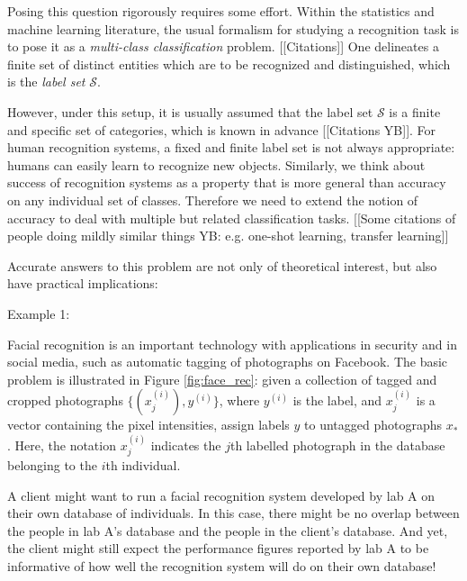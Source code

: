 \documentclass[twoside,11pt]{article}
\begin{document}
Posing this question rigorously requires some effort. 
Within the statistics and machine learning literature, the usual
formalism for studying a recognition task is to pose it as a
\emph{multi-class classification} problem. [[Citations]] One delineates a finite
set of distinct entities which are to be recognized and distinguished,
which is the \emph{label set} $\mathcal{S}$. 

However, under this setup, it is usually assumed that the
label set $\mathcal{S}$ is a finite and specific set of categories, which is known in advance [[Citations YB]]. For human recognition systems, a fixed and finite label set is not always appropriate: humans can easily learn to recognize new objects. Similarly, we think about success of recognition systems as a property that is more general than accuracy on any individual set of classes. Therefore we need to extend the notion of accuracy to deal with multiple but related classification tasks.
[[Some citations of people doing mildly similar things YB: e.g. one-shot learning, transfer learning]] 


Accurate answers to this problem are not only of theoretical interest, but also have practical implications:

Example 1:

Facial recognition is an important technology with applications in
security and in social media, such as automatic tagging of photographs
on Facebook.  The basic problem is illustrated in Figure
\ref{fig:face_rec}: given a collection of tagged and cropped
photographs $\{(x_j^{(i)}), y^{(i)}\}$, where $y^{(i)}$ is the
label, and $x_j^{(i)}$ is a vector containing the pixel intensities, assign labels $y$ to
untagged photographs $x_*$.  Here, the notation
$x_j^{(i)}$ indicates the $j$th labelled photograph in the
database belonging to the $i$th individual. 

A client might want to run a facial recognition system
developed by lab A on their own database of individuals.  In this
case, there might be no overlap between the people in lab A's database
and the people in the client's database.  And yet, the client might
still expect the performance figures reported by lab A to be
informative of how well the recognition system will do on their own
database!
\end{document}
